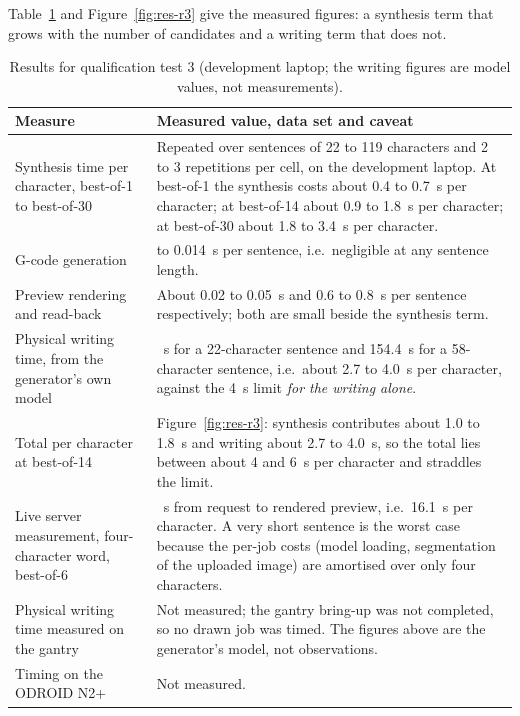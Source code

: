 
            Table~\ref{tab:res-r3} and Figure~\ref{fig:res-r3} give the measured figures: a synthesis term that grows with the number of candidates and a writing term that does not.

\begin{table}[h]
\centering
\fontsize{9.5}{11.5}\selectfont
\begin{tabularx}{\linewidth}{|>{\raggedright\arraybackslash}p{4.6cm}|>{\raggedright\arraybackslash}X|}
\hline
\textbf{Measure} & \textbf{Measured value, data set and caveat} \\
\hline
Synthesis time per character, best-of-1 to best-of-30 & Repeated over sentences of 22 to 119 characters and 2 to 3 repetitions per cell, on the development laptop. At best-of-1 the synthesis costs about 0.4 to 0.7~s per character; at best-of-14 about 0.9 to 1.8~s per character; at best-of-30 about 1.8 to 3.4~s per character. \\
\hline
G-code generation & 0.006 to 0.014~s per sentence, i.e.\ negligible at any sentence length. \\
\hline
Preview rendering and read-back & About 0.02 to 0.05~s and 0.6 to 0.8~s per sentence respectively; both are small beside the synthesis term. \\
\hline
Physical writing time, from the generator's own model & 88.7~s for a 22-character sentence and 154.4~s for a 58-character sentence, i.e.\ about 2.7 to 4.0~s per character, against the 4~s limit \emph{for the writing alone}. \\
\hline
Total per character at best-of-14 & Figure~\ref{fig:res-r3}: synthesis contributes about 1.0 to 1.8~s and writing about 2.7 to 4.0~s, so the total lies between about 4 and 6~s per character and straddles the limit. \\
\hline
Live server measurement, four-character word, best-of-6 & 64.3~s from request to rendered preview, i.e.\ 16.1~s per character. A very short sentence is the worst case because the per-job costs (model loading, segmentation of the uploaded image) are amortised over only four characters. \\
\hline
Physical writing time measured on the gantry & Not measured; the gantry bring-up was not completed, so no drawn job was timed. The figures above are the generator's model, not observations. \\
\hline
Timing on the ODROID N2+ & Not measured. \\
\hline
\end{tabularx}
\caption{Results for qualification test 3 (development laptop; the writing figures are model values, not measurements).}
\label{tab:res-r3}
\end{table}

